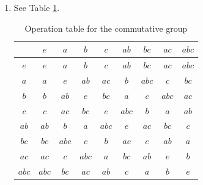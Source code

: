 \documentclass{article}
\begin{document}
\begin{enumerate}
        \item See Table \ref{tab:op-table-commutative}.
            \begin{table}[]
                \centering
                \begin{tabular}{c|cccccccc}
                    & $e$   & $a$   & $b$   & $c$   & $ab$  & $bc$  & $ac$  & $abc$ \\ \hline
                $e$   & $e$   & $a$   & $b$   & $c$   & $ab$  & $bc$  & $ac$  & $abc$ \\
                $a$   & $a$   & $e$   & $ab$  & $ac$  & $b$   & $abc$ & $c$   & $bc$  \\
                $b$   & $b$   & $ab$  & $e$   & $bc$  & $a$   & $c$   & $abc$ & $ac$  \\
                $c$   & $c$   & $ac$  & $bc$  & $e$   & $abc$ & $b$   & $a$   & $ab$  \\
                $ab$  & $ab$  & $b$   & $a$   & $abc$ & $e$   & $ac$  & $bc$  & $c$   \\
                $bc$  & $bc$  & $abc$ & $c$   & $b$   & $ac$  & $e$   & $ab$  & $a$   \\
                $ac$  & $ac$  & $c$   & $abc$ & $a$   & $bc$  & $ab$  & $e$   & $b$   \\
                $abc$ & $abc$ & $bc$  & $ac$  & $ab$  & $c$   & $a$   & $b$   & $e$  
                \end{tabular}
                \caption{Operation table for the commutative group}
                \label{tab:op-table-commutative}
            \end{table}
    \end{enumerate}
\end{document}
